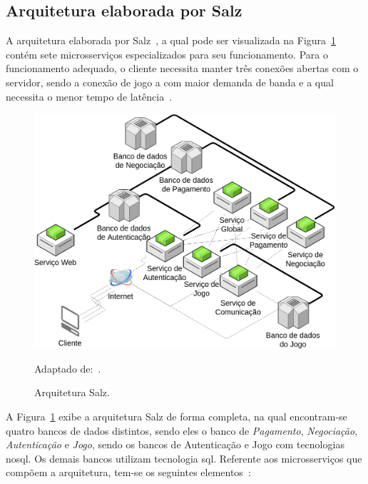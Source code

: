 \subsection{Arquitetura elaborada por Salz}
\label{salz}

A arquitetura elaborada por Salz~\cite{albion_online_unite}, a qual pode ser visualizada na Figura~\ref{full_salz} contém sete microsserviços especializados para seu funcionamento.
%
Para o funcionamento adequado, o cliente necessita manter três conexões abertas com o servidor, sendo a conexão de jogo a com maior demanda de banda e a qual necessita o menor tempo de latência~\cite{albion_online_unite}.

\begin{figure}[htb!]
  \caption{Arquitetura Salz.}
  \label{full_salz}
  \includegraphics[width=\textwidth]{arquiteturas/full_salz.png}
  \centering

  Adaptado de:~\cite{albion_online_unite}.
\end{figure}



A Figura~\ref{full_salz} exibe a arquitetura Salz de forma completa, na qual encontram-se quatro bancos de dados distintos, sendo eles o banco de \textit{Pagamento}, \textit{Negociação}, \textit{Autenticação} e \textit{Jogo}, sendo os bancos de Autenticação e Jogo com tecnologias \ac{nosql}. Os demais bancos utilizam tecnologia \ac{sql}.
%
Referente aos microsserviços que compõem a arquitetura, tem-se os seguintes elementos~\cite{salz_albion}:



